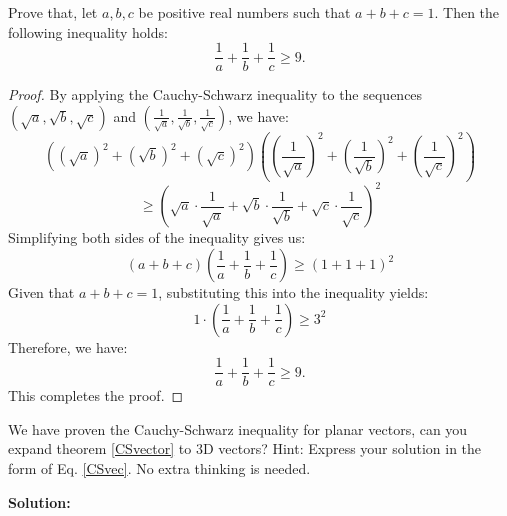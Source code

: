 \begin{exercise}
    Prove that, let \( a, b, c \) be positive real numbers such that \( a + b + c = 1 \). Then the following inequality holds:
\[
\frac{1}{a} + \frac{1}{b} + \frac{1}{c} \geq 9.
\]
\end{exercise}
\begin{proof}
    By applying the Cauchy-Schwarz inequality to the sequences \( (\sqrt{a}, \sqrt{b}, \sqrt{c}) \) and \( (\frac{1}{\sqrt{a}}, \frac{1}{\sqrt{b}}, \frac{1}{\sqrt{c}} ) \), we have:
\[
\left( (\sqrt{a})^2 + (\sqrt{b})^2 + (\sqrt{c})^2 \right) \left( \left(\frac{1}{\sqrt{a}}\right)^2 + \left(\frac{1}{\sqrt{b}}\right)^2 + \left(\frac{1}{\sqrt{c}}\right)^2 \right) 
\]
\[
\geq \left( \sqrt{a} \cdot \frac{1}{\sqrt{a}} + \sqrt{b} \cdot \frac{1}{\sqrt{b}} + \sqrt{c} \cdot \frac{1}{\sqrt{c}} \right)^2
\]
Simplifying both sides of the inequality gives us:
\[
(a + b + c) \left( \frac{1}{a} + \frac{1}{b} + \frac{1}{c} \right) \geq (1 + 1 + 1)^2
\]
Given that \( a + b + c = 1 \), substituting this into the inequality yields:
\[
1 \cdot \left( \frac{1}{a} + \frac{1}{b} + \frac{1}{c} \right) \geq 3^2
\]
Therefore, we have:
\[
\frac{1}{a} + \frac{1}{b} + \frac{1}{c} \geq 9.
\]
This completes the proof.
\end{proof}
\begin{exercise}
    We have proven the Cauchy-Schwarz inequality for planar vectors, can you expand theorem \ref{CSvector}
to 3D vectors? Hint: Express your solution in the form of Eq. \ref{CSvec}. No extra thinking is needed.
\end{exercise}
\textbf{Solution:}

